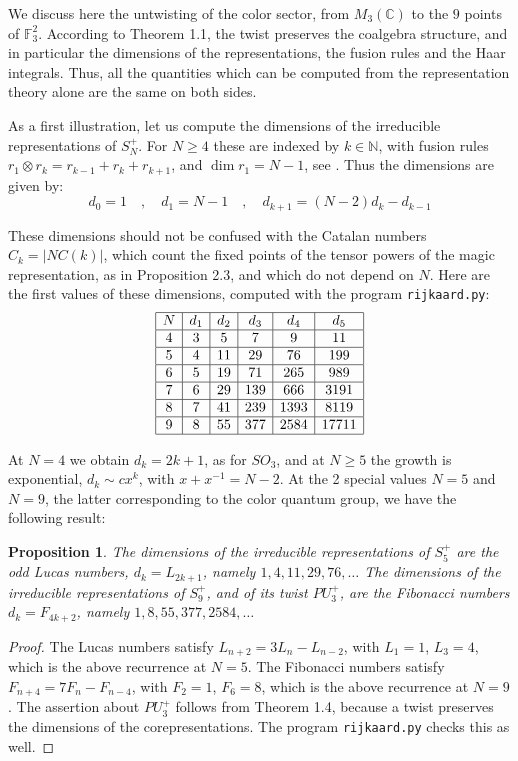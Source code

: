 \documentclass[11pt]{amsart}
\newtheorem{proposition}[theorem]{Proposition}
\theoremstyle{definition}
\begin{document}
We discuss here the untwisting of the color sector, from $M_3(\mathbb C)$ to the $9$ points of $\mathbb F_3^2$. According to Theorem 1.1, the twist preserves the coalgebra structure, and in particular the dimensions of the representations, the fusion rules and the Haar integrals. Thus, all the quantities which can be computed from the representation theory alone are the same on both sides.

As a first illustration, let us compute the dimensions of the irreducible representations of $S_N^+$. For $N\geq4$ these are indexed by $k\in\mathbb N$, with fusion rules $r_1\otimes r_k=r_{k-1}+r_k+r_{k+1}$, and $\dim r_1=N-1$, see \cite{ban}. Thus the dimensions are given by:
$$d_0=1\quad,\quad d_1=N-1\quad,\quad d_{k+1}=(N-2)d_k-d_{k-1}$$

These dimensions should not be confused with the Catalan numbers $C_k=|NC(k)|$, which count the fixed points of the tensor powers of the magic representation, as in Proposition 2.3, and which do not depend on $N$. Here are the first values of these dimensions, computed with the program {\tt rijkaard.py}:
$$\begin{array}{|c|c|c|c|c|c|}
\hline
N&d_1&d_2&d_3&d_4&d_5\\
\hline
4&3&5&7&9&11\\
\hline
5&4&11&29&76&199\\
\hline
6&5&19&71&265&989\\
\hline
7&6&29&139&666&3191\\
\hline
8&7&41&239&1393&8119\\
\hline
9&8&55&377&2584&17711\\
\hline
\end{array}$$

At $N=4$ we obtain $d_k=2k+1$, as for $SO_3$, and at $N\geq5$ the growth is exponential, $d_k\sim cx^k$, with $x+x^{-1}=N-2$. At the 2 special values $N=5$ and $N=9$, the latter corresponding to the color quantum group, we have the following result:

\begin{proposition}
The dimensions of the irreducible representations of $S_5^+$ are the odd Lucas numbers, $d_k=L_{2k+1}$, namely $1,4,11,29,76,\ldots$ The dimensions of the irreducible representations of $S_9^+$, and of its twist $PU_3^+$, are the Fibonacci numbers $d_k=F_{4k+2}$, namely $1,8,55,377,2584,\ldots$
\end{proposition}

\begin{proof}
The Lucas numbers satisfy $L_{n+2}=3L_n-L_{n-2}$, with $L_1=1$, $L_3=4$, which is the above recurrence at $N=5$. The Fibonacci numbers satisfy $F_{n+4}=7F_n-F_{n-4}$, with $F_2=1$, $F_6=8$, which is the above recurrence at $N=9$. The assertion about $PU_3^+$ follows from Theorem 1.4, because a twist preserves the dimensions of the corepresentations. The program {\tt rijkaard.py} checks this as well.
\end{proof}
\end{document}
